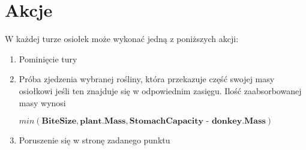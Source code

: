 \section{Akcje}
W każdej turze osiołek może wykonać jedną z poniższych akcji:
\begin{enumerate}    
    \item Pominięcie tury
    \item Próba zjedzenia wybranej rośliny, która przekazuje część swojej masy osiołkowi jeśli ten znajduje się w odpowiednim zasięgu. Ilość zaabsorbowanej masy wynosi 
    
    $min(\textbf{BiteSize}, \textbf{plant.Mass}, \textbf{StomachCapacity - donkey.Mass})$
    \item Poruszenie się w stronę zadanego punktu
\end{enumerate}



